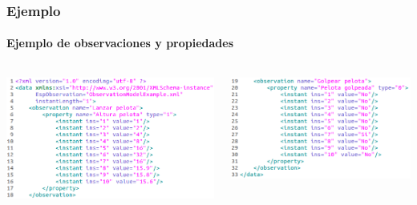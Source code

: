 \begin{frame}
	\frametitle{Ejemplo}
	\framesubtitle{Ejemplo de observaciones y propiedades}
	
	\begin{columns}[T] %
		\begin{column}[T]{5cm} %
			\begin{center}
				\includegraphics[width=1.1\linewidth]{./Figures/Datos1.png}
			\end{center}

		\end{column}
		\begin{column}[T]{5cm} %
			\begin{center}
				\includegraphics[width=1.1\linewidth]{./Figures/Datos2.png}
			\end{center}
		\end{column}
	\end{columns}
\end{frame}

